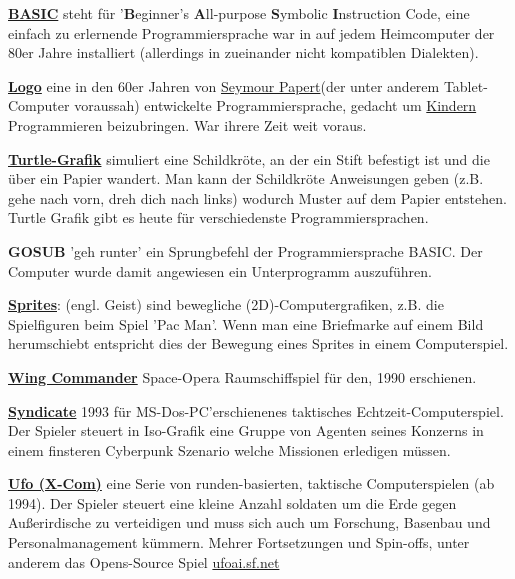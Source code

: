 \href{https://de.wikipedia.org/wiki/BASIC}{\textbf{BASIC}} steht für '\textbf{B}eginner’s \textbf{A}ll-purpose \textbf{S}ymbolic \textbf{I}nstruction Code, eine einfach zu erlernende Programmiersprache war in auf jedem Heimcomputer der 80er Jahre installiert (allerdings in zueinander nicht kompatiblen Dialekten). 

\href{https://de.wikipedia.org/wiki/Logo_(Programmiersprache)}{\textbf{Logo}} eine in den 60er Jahren von \href{https://de.wikipedia.org/wiki/Seymour_Papert}{Seymour Papert}(der unter anderem Tablet-Computer voraussah) entwickelte Programmiersprache, gedacht um \href{http://goo.gl/zJG9WU}{Kindern} Programmieren beizubringen. War ihrere Zeit weit voraus.

\href{https://de.wikipedia.org/wiki/Turtlegraphics}{\textbf{Turtle-Grafik}} simuliert eine Schildkröte, an der ein Stift befestigt ist und die über ein Papier wandert. Man kann der Schildkröte Anweisungen geben (z.B. gehe nach vorn, dreh dich nach links) wodurch Muster auf dem Papier entstehen. Turtle Grafik gibt es heute für verschiedenste Programmiersprachen.

\textbf{GOSUB} 'geh runter' ein Sprungbefehl der Programmiersprache BASIC. Der Computer wurde damit angewiesen ein Unterprogramm auszuführen.

\href{https://de.wikipedia.org/wiki/Sprite_(Computergrafik)}{\textbf{Sprites}}: (engl. Geist) sind bewegliche (2D)-Computergrafiken, z.B. die Spielfiguren beim Spiel 'Pac Man'.  Wenn man eine Briefmarke auf einem Bild herumschiebt entspricht dies der Bewegung eines Sprites in einem Computerspiel.

\href{https://de.wikipedia.org/wiki/Wing_Commander_(Computerspiel)}{\textbf{Wing Commander}} Space-Opera Raumschiffspiel für den, 1990 erschienen.

\href{https://de.wikipedia.org/wiki/Syndicate}{\textbf{Syndicate}} 1993 für MS-Dos-PC'erschienenes taktisches Echtzeit-Computerspiel. Der Spieler steuert in Iso-Grafik eine Gruppe von Agenten seines Konzerns in einem finsteren Cyberpunk Szenario welche Missionen erledigen müssen.

\href{https://de.wikipedia.org/wiki/X-COM}{\textbf{Ufo (X-Com)}} eine Serie von runden-basierten, taktische Computerspielen (ab 1994). Der Spieler steuert eine  kleine Anzahl soldaten um die Erde gegen Außerirdische zu verteidigen und muss sich auch um Forschung, Basenbau und Personalmanagement kümmern. Mehrer Fortsetzungen und Spin-offs, unter anderem das Opens-Source Spiel \url{ufoai.sf.net}

